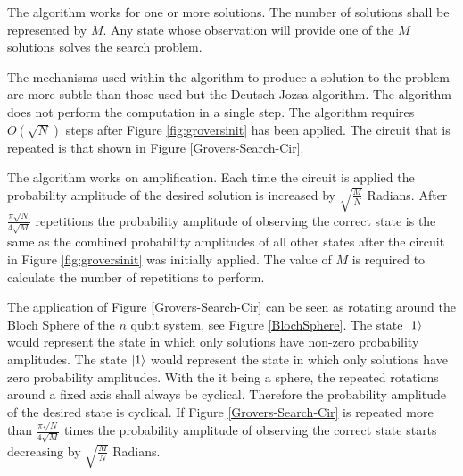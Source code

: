 The algorithm works for one or more solutions.
The number of solutions shall be represented by $M$.
Any state whose observation will provide one of the $M$ solutions solves the search problem.

The mechanisms used within the algorithm to produce a solution to the problem are more subtle than those used but the Deutsch-Jozsa algorithm.
The algorithm does not perform the computation in a single step.
The algorithm requires $O(\sqrt{N})$ steps after Figure \ref{fig:groversinit} has been applied.
The circuit that is repeated is that shown in Figure \ref{Grovers-Search-Cir}.

The algorithm works on amplification.
Each time the circuit is applied the probability amplitude of the desired solution is increased by $\sqrt{\frac{M}{N}}$ Radians.
After $\frac{\pi\sqrt{N}}{4\sqrt{M}}$ repetitions the probability amplitude of observing the correct state is the same as the combined probability amplitudes of all other states after the circuit in Figure \ref{fig:groversinit} was initially applied.
The value of $M$ is required to calculate the number of repetitions to perform.

The application of Figure \ref{Grovers-Search-Cir} can be seen as rotating around the Bloch Sphere of the $n$ qubit system, see Figure \ref{BlochSphere}.
The state $\left\vert{1}\right\rangle$ would represent the state in which only solutions have non-zero probability amplitudes.
The state $\left\vert{1}\right\rangle$ would represent the state in which only solutions have zero probability amplitudes.
With the it being a sphere, the repeated rotations around a fixed axis shall always be cyclical.
Therefore the probability amplitude of the desired state is cyclical.
If Figure \ref{Grovers-Search-Cir} is repeated more than $\frac{\pi\sqrt{N}}{4\sqrt{M}}$ times the probability amplitude of observing the correct state starts decreasing by $\sqrt{\frac{M}{N}}$ Radians.


